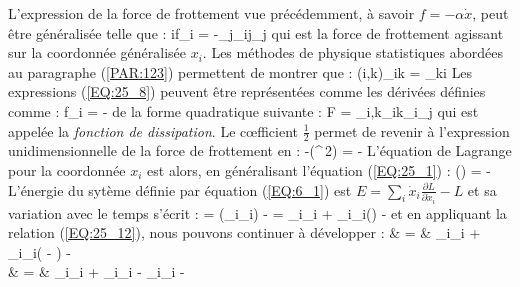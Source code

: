 L'expression de la force de frottement vue pr\'{e}c\'{e}demment, \`{a} savoir $f = -\alpha\dot{x}$, peut \^{e}tre g\'{e}n\'{e}ralis\'{e}e telle que :
\be
	\forall i\text{, }f_{i} = -\sum_{j}\alpha_{ij}_{j} \label{EQ:25_8}
\ee
qui est la force de frottement agissant sur la coordonn\'{e}e g\'{e}n\'{e}ralis\'{e}e $x_{i}$. Les m\'{e}thodes de physique statistiques abord\'{e}es au paragraphe (\ref{PAR:123}) permettent de montrer que :
\benn
	\forall (i,k)\text{, }\alpha_{ik} = \alpha_{ki} \label{EQ:25_9}
\eenn
Les expressions (\ref{EQ:25_8}) peuvent \^{e}tre repr\'{e}sent\'{e}es comme les d\'{e}riv\'{e}es d\'{e}finies comme :
\be
	f_{i} = - \label{EQ:25_10}
\ee
de la forme quadratique suivante :
\be
	F = \sum_{i,k}\alpha_{ik}_{i}_{j}  \label{EQ:25_11}
\ee
qui est appel\'{e}e la \emph{fonction de dissipation}. Le c{\oe}fficient $\frac{1}{2}$ permet de revenir \`{a} l'expression unidimensionnelle de la force de frottement en :
\benn
	-\left(^{\,2}\right) = -\alpha{}
\eenn
L'\'{e}quation de Lagrange pour la coordonn\'{e}e $x_{i}$ est alors, en g\'{e}n\'{e}ralisant l'\'{e}quation (\ref{EQ:25_1}) :
\be
	\left(\right) =  -  \label{EQ:25_12}
\ee
L'\'{e}nergie du syt\`{e}me d\'{e}finie par \'{e}quation (\ref{EQ:6_1}) est $E = \sum_{i}\dot{x}_{i}\frac{\partial L}{\partial\dot{x}_{i}} - L$ et sa variation avec le temps s'\'{e}crit :
\benn
	 = \left(\sum_{i}_{i}\right) -  = \sum_{i}_{i} + \sum_{i}_{i}\left(\right) - 
\eenn
et en appliquant la relation (\ref{EQ:25_12}), nous pouvons continuer \`{a} d\'{e}velopper :
\bea
	 & = & \sum_{i}_{i} + \sum_{i}_{i}\left( - \right) -  \nonumber \\
	& = & \sum_{i}_{i} + \sum_{i}_{i} - \sum_{i}_{i} -  \nonumber
